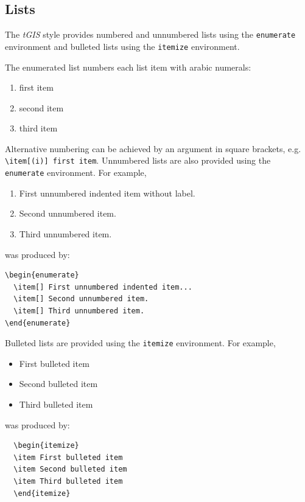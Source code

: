 \documentclass[]{tGIS2e}
\begin{document}

\subsection{Lists}

The {\it tGIS} style provides numbered and unnumbered lists using the {\tt enumerate} environment and bulleted
lists  using the {\tt itemize} environment.

The enumerated list numbers each list item with arabic numerals:
%
\begin{enumerate}
   \item first item
   \item second item
   \item third item
\end{enumerate}
%
Alternative numbering can be achieved by an argument in square brackets, e.g. \verb"\item[(i)] first item".
%
Unnumbered lists are also provided using the {\tt enumerate} environment.
For example,
\begin{enumerate}
   \item[] First unnumbered indented item without label.
   \item[] Second unnumbered item.
   \item[] Third unnumbered item.
\end{enumerate}
was produced by:
%
\begin{verbatim}
\begin{enumerate}
  \item[] First unnumbered indented item...
  \item[] Second unnumbered item.
  \item[] Third unnumbered item.
\end{enumerate}
\end{verbatim}
%
Bulleted lists are provided using the {\tt itemize} environment. For example,
\begin{itemize}
\item First bulleted item
\item Second bulleted item
\item Third bulleted item
\end{itemize}
was produced by:
\begin{verbatim}
  \begin{itemize}
  \item First bulleted item
  \item Second bulleted item
  \item Third bulleted item
  \end{itemize}
\end{verbatim}
\end{document}
